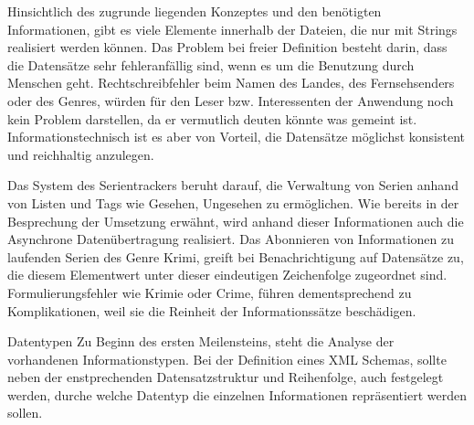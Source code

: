 \documentclass[a4paper]{article}
\begin{document}
Hinsichtlich des zugrunde liegenden Konzeptes und den benötigten Informationen, gibt es viele Elemente
innerhalb der Dateien, die nur mit Strings realisiert werden können. Das Problem bei freier Definition
besteht darin, dass die Datensätze sehr fehleranfällig sind, wenn es um die Benutzung durch Menschen geht.
Rechtschreibfehler beim Namen des Landes, des Fernsehsenders oder des Genres, würden für den Leser bzw.
Interessenten der Anwendung noch kein Problem darstellen, da er vermutlich deuten könnte was gemeint ist.
Informationstechnisch ist es aber von Vorteil, die Datensätze möglichst konsistent und reichhaltig anzulegen.

Das System des Serientrackers beruht darauf, die Verwaltung von Serien anhand von Listen und Tags wie
Gesehen, Ungesehen zu ermöglichen. Wie bereits in der Besprechung der Umsetzung erwähnt, wird anhand
dieser Informationen auch die Asynchrone Datenübertragung realisiert.
Das Abonnieren von Informationen zu laufenden Serien des Genre Krimi, greift bei Benachrichtigung auf
Datensätze zu, die diesem Elementwert unter dieser eindeutigen Zeichenfolge zugeordnet sind. Formulierungsfehler
wie Krimie oder Crime, führen dementsprechend zu Komplikationen, weil sie die Reinheit der Informationssätze beschädigen.

Datentypen
Zu Beginn des ersten Meilensteins, steht die Analyse der vorhandenen Informationstypen.
Bei der Definition eines XML Schemas, sollte neben der enstprechenden Datensatzstruktur und Reihenfolge,
auch festgelegt werden, durche welche Datentyp die einzelnen Informationen repräsentiert werden sollen.

\newpage
\end{document}
